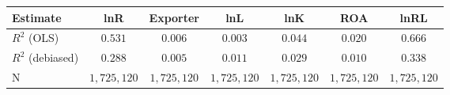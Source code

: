\begin{tabular}{l*{6}{c}}
\hline\hline
 Estimate & lnR & Exporter & lnL & lnK & ROA & lnRL \\
\hline
\addlinespace $ R^2$ (OLS) & $0.531$ & $0.006$ & $0.003$ & $0.044$ & $0.020$ & $0.666$ \\
$ R^2$ (debiased) & $0.288$ & $0.005$ & $0.011$ & $0.029$ & $0.010$ & $0.338$ \\
N & $1,725,120$ & $1,725,120$ & $1,725,120$ & $1,725,120$ & $1,725,120$ & $1,725,120$ \\
\hline\hline
\end{tabular}
